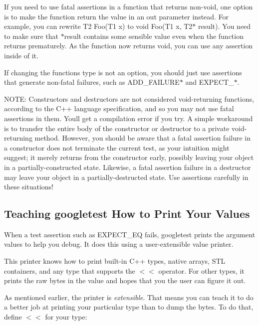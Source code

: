 If you need to use fatal assertions in a function that returns non-\/void, one option is to make the function return the value in an out parameter instead. For example, you can rewrite {\ttfamily T2 Foo(\+T1 x)} to {\ttfamily void Foo(\+T1 x, T2$\ast$ result)}. You need to make sure that {\ttfamily $\ast$result} contains some sensible value even when the function returns prematurely. As the function now returns {\ttfamily void}, you can use any assertion inside of it.

If changing the function\textquotesingle{}s type is not an option, you should just use assertions that generate non-\/fatal failures, such as {\ttfamily A\+D\+D\+\_\+\+F\+A\+I\+L\+U\+R\+E$\ast$} and {\ttfamily E\+X\+P\+E\+C\+T\+\_\+$\ast$}.

N\+O\+TE\+: Constructors and destructors are not considered void-\/returning functions, according to the C++ language specification, and so you may not use fatal assertions in them. You\textquotesingle{}ll get a compilation error if you try. A simple workaround is to transfer the entire body of the constructor or destructor to a private void-\/returning method. However, you should be aware that a fatal assertion failure in a constructor does not terminate the current test, as your intuition might suggest; it merely returns from the constructor early, possibly leaving your object in a partially-\/constructed state. Likewise, a fatal assertion failure in a destructor may leave your object in a partially-\/destructed state. Use assertions carefully in these situations!

\subsection*{Teaching googletest How to Print Your Values}

When a test assertion such as {\ttfamily E\+X\+P\+E\+C\+T\+\_\+\+EQ} fails, googletest prints the argument values to help you debug. It does this using a user-\/extensible value printer.

This printer knows how to print built-\/in C++ types, native arrays, S\+TL containers, and any type that supports the {\ttfamily $<$$<$} operator. For other types, it prints the raw bytes in the value and hopes that you the user can figure it out.

As mentioned earlier, the printer is {\itshape extensible}. That means you can teach it to do a better job at printing your particular type than to dump the bytes. To do that, define {\ttfamily $<$$<$} for your type\+:


